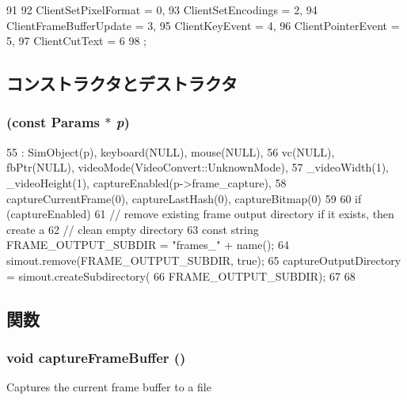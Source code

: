 \begin{DoxyCode}
91                         {
92         ClientSetPixelFormat    = 0,
93         ClientSetEncodings      = 2,
94         ClientFrameBufferUpdate = 3,
95         ClientKeyEvent          = 4,
96         ClientPointerEvent      = 5,
97         ClientCutText           = 6
98     };
\end{DoxyCode}


\subsection{コンストラクタとデストラクタ}
\hypertarget{classVncInput_aa1f9aa1c07faf127e4006b0ab3369039}{
\subsubsection[{VncInput}]{ (const {\bf Params} $\ast$ {\em p})}}
\label{classVncInput_aa1f9aa1c07faf127e4006b0ab3369039}



\begin{DoxyCode}
55     : SimObject(p), keyboard(NULL), mouse(NULL),
56       vc(NULL), fbPtr(NULL), videoMode(VideoConvert::UnknownMode),
57       _videoWidth(1), _videoHeight(1), captureEnabled(p->frame_capture),
58       captureCurrentFrame(0), captureLastHash(0), captureBitmap(0)
59 {
60     if (captureEnabled) {
61         // remove existing frame output directory if it exists, then create a
62         //   clean empty directory
63         const string FRAME_OUTPUT_SUBDIR = "frames_" + name();
64         simout.remove(FRAME_OUTPUT_SUBDIR, true);
65         captureOutputDirectory = simout.createSubdirectory(
66                                 FRAME_OUTPUT_SUBDIR);
67     }
68 }
\end{DoxyCode}


\subsection{関数}
\hypertarget{classVncInput_a5356f969a4a40d8334a0fa3c29a2d0d2}{
\subsubsection[{captureFrameBuffer}]{\setlength{\rightskip}{0pt plus 5cm}void captureFrameBuffer ()}}
\label{classVncInput_a5356f969a4a40d8334a0fa3c29a2d0d2}
Captures the current frame buffer to a file 


